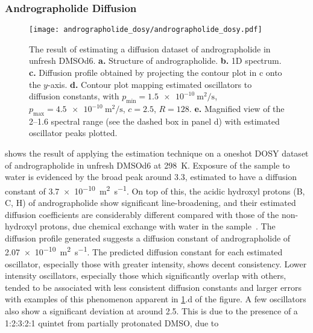 \subsubsection{Andrographolide Diffusion}
\begin{figure}
    \centering
    \texttt{[image: andrographolide\_dosy/andrographolide\_dosy.pdf]}
    \caption[
        The result of estimating a diffusion dataset of andrographolide.
    ]{
        The result of estimating a diffusion dataset of andrographolide in
        unfresh \acs{DMSOd6}.
        \textbf{a.} Structure of andrographolide.
        \textbf{b.} \ac{1D} spectrum.
        \textbf{c.} Diffusion profile obtained by projecting the contour plot in
        c onto the $y$-axis.
        \textbf{d.} Contour plot mapping estimated oscillators to diffusion constants, with
        $p_{\text{min}} = \qty{1.5e-10}{\meter\squared\per\second}$,
        $p_{\text{max}} = \qty{4.5e-10}{\meter\squared\per\second}$,
        $c = 2.5$,
        $R=128$.
        \textbf{e.} Magnified view of the \SIrange{2}{1.6}{\partspermillion}
        spectral range (see the dashed box in panel d) with estimated
        oscillator peaks plotted.
    }
    \label{fig:andrographolide-dosy}
\end{figure}
 shows the result of applying the
estimation technique on a oneshot \ac{DOSY} dataset of andrographolide in
unfresh \acs{DMSOd6} at \qty{298}{\kelvin}. Exposure of the sample to water is
evidenced by the broad
peak around \qty{3.3}{\partspermillion}, estimated to have a diffusion constant
of \qty{3.7e-10}{\meter\squared\per\second}. On top of this, the acidic
hydroxyl protons (B, C, H) of andrographolide show significant line-broadening,
and their estimated diffusion coefficients are considerably different compared
with those of the non-hydroxyl protons, due chemical exchange with water in the
sample~\cite{Chen1998}.
The diffusion profile generated suggests a diffusion constant of andrographolide of
\qty{2.07e-10}{\meter\squared\per\second}. The predicted diffusion constant for
each estimated oscillator, especially those with greater intensity, shows
decent consistency.
Lower intensity oscillators, especially those which
significantly overlap with others, tended to be associated with
less consistent diffusion constants and larger errors with examples of this
phenomenon apparent in \cref{fig:andrographolide-dosy}.d of the figure. A few
oscillators also show a
significant deviation at around \qty{2.5}{\partspermillion}. This is due to the
presence of a 1:2:3:2:1 quintet from partially protonated \acs{DMSO}, due to
